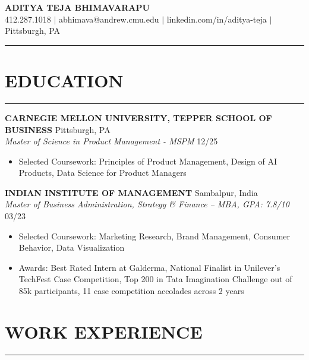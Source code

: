 \documentclass[10pt,letterpaper]{article}
\newcommand{\sectionline}{\par\vspace{-0.5em}\noindent\rule{\textwidth}{0.6pt}\vspace{0.3em}\par}
\begin{document}
\begin{center}
  {\LARGE \textbf{ADITYA TEJA BHIMAVARAPU}}\\
  412.287.1018 $|$ abhimava@andrew.cmu.edu $|$ linkedin.com/in/aditya-teja $|$ Pittsburgh, PA
\end{center}
\sectionline

\section*{EDUCATION}
\sectionline

\noindent\textbf{CARNEGIE MELLON UNIVERSITY, TEPPER SCHOOL OF BUSINESS} \hfill Pittsburgh, PA\\
\textit{Master of Science in Product Management - MSPM} \hfill 12/25
\begin{itemize}
  \item Selected Coursework: Principles of Product Management, Design of AI Products, Data Science for Product Managers
\end{itemize}

\noindent\textbf{INDIAN INSTITUTE OF MANAGEMENT} \hfill Sambalpur, India\\
\textit{Master of Business Administration, Strategy \& Finance – MBA, GPA: 7.8/10} \hfill 03/23
\begin{itemize}
  \item Selected Coursework: Marketing Research, Brand Management, Consumer Behavior, Data Visualization
  \item Awards: Best Rated Intern at Galderma, National Finalist in Unilever's TechFest Case Competition, Top 200 in Tata Imagination Challenge out of 85k participants, 11 case competition accolades across 2 years
\end{itemize}

\section*{WORK EXPERIENCE}
\sectionline
\end{document}
